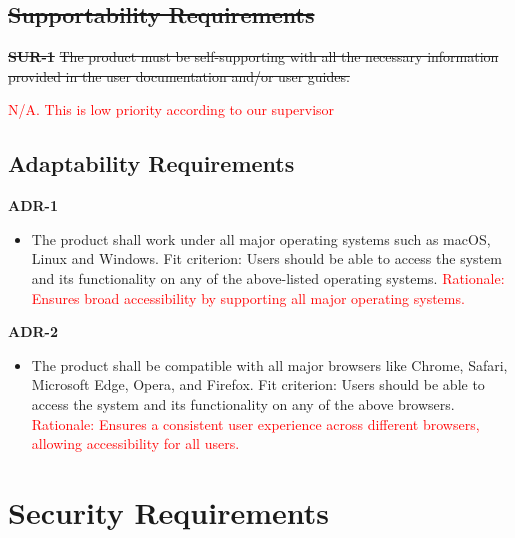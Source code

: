 \documentclass[12pt]{article}
\begin{document}
\subsection{\sout{Supportability Requirements}}
\textbf{\sout{SUR-1}}
\sout{The product must be self-supporting with all the necessary information provided in the user documentation and/or user guides.}

\textcolor{red}{N/A. This is low priority according to our supervisor}

\subsection{Adaptability Requirements}
\textbf{ADR-1}
\begin{itemize}
    \item The product shall work under all major operating systems such as macOS, Linux and Windows. \hfill \break
    Fit criterion: Users should be able to access the system and its functionality on any of the above-listed operating systems.
    \hfill \break
    \textcolor{red} {Rationale: Ensures broad accessibility by supporting all major operating systems.}
\end{itemize}
\textbf{ADR-2}
\begin{itemize}
    \item The product shall be compatible with all major browsers like Chrome, Safari, Microsoft Edge, Opera, and Firefox. \hfill \break
    Fit criterion: Users should be able to access the system and its functionality on any of the above browsers.
    \hfill \break
    \textcolor{red} {Rationale: Ensures a consistent user experience across different browsers, allowing accessibility for all users.}
\end{itemize}


\section{Security Requirements}
\end{document}
